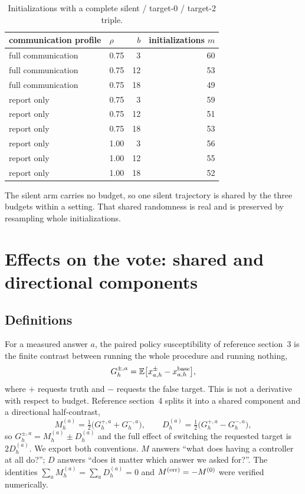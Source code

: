 \documentclass[11pt]{article}
\begin{document}
\begin{table}[htbp]\centering\small
\caption{Initializations with a complete silent / target-0 / target-2 triple.}\label{tab:sample}
\begin{tabular}{llrr}
\toprule
communication profile & $\rho$ & $b$ & initializations $m$ \\
\midrule
full communication & 0.75 & 3 & 60 \\
full communication & 0.75 & 12 & 53 \\
full communication & 0.75 & 18 & 49 \\
report only & 0.75 & 3 & 59 \\
report only & 0.75 & 12 & 51 \\
report only & 0.75 & 18 & 53 \\
report only & 1.00 & 3 & 56 \\
report only & 1.00 & 12 & 55 \\
report only & 1.00 & 18 & 52 \\
\bottomrule
\end{tabular}
\end{table}

The silent arm carries no budget, so one silent trajectory is shared by the three budgets
within a setting. That shared randomness is real and is preserved by resampling whole
initializations.

\section{Effects on the vote: shared and directional components}
\subsection{Definitions}
For a measured answer $a$, the paired policy susceptibility of reference section~3 is the
finite contrast between running the whole procedure and running nothing,
\begin{equation}
G_h^{\pm,a}=\mathbb E\big[x_{a,h}^{\pm}-x_{a,h}^{\rm base}\big],
\end{equation}
where $+$ requests truth and $-$ requests the false target. This is not a derivative with
respect to budget. Reference section~4 splits it into a shared component and a directional
half-contrast,
\begin{equation}
M_h^{(a)}=\tfrac12\big(G_h^{+,a}+G_h^{-,a}\big),\qquad
D_h^{(a)}=\tfrac12\big(G_h^{+,a}-G_h^{-,a}\big),
\end{equation}
so $G^{\pm,a}_h=M^{(a)}_h\pm D^{(a)}_h$ and the full effect of switching the requested
target is $2D^{(a)}_h$. We export both conventions. $M$ answers ``what does having a
controller at all do?''; $D$ answers ``does it matter which answer we asked for?''. The
identities $\sum_a M^{(a)}_h=\sum_a D^{(a)}_h=0$ and $M^{(\rm err)}=-M^{(0)}$ were verified
numerically.
\end{document}
